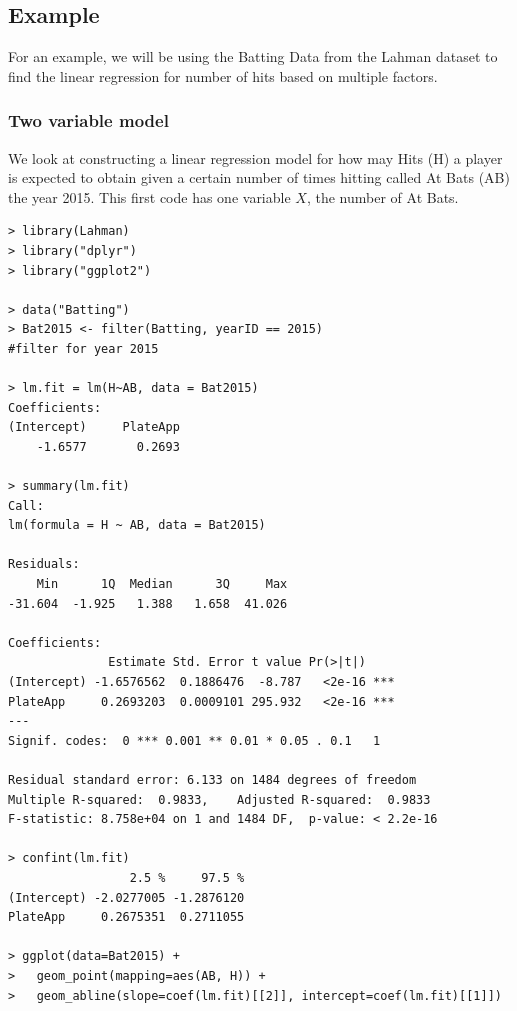 \documentclass[11pt,a4paper]{report}
\begin{document}
\subsection{Example}
For an example, we will be using the Batting Data from the Lahman dataset to find the linear regression for number of hits based on multiple factors.

\subsubsection{Two variable model}
We look at constructing a linear regression model for how may Hits (H) a player is expected to obtain given a certain number of times hitting called At Bats (AB) the year 2015. This first code has one variable $X$, the number of At Bats.
\begin{lstlisting}[basicstyle=\scriptsize]
> library(Lahman)
> library("dplyr")
> library("ggplot2")

> data("Batting")
> Bat2015 <- filter(Batting, yearID == 2015) 
#filter for year 2015
  
> lm.fit = lm(H~AB, data = Bat2015)
Coefficients:
(Intercept)     PlateApp  
    -1.6577       0.2693  

> summary(lm.fit)
Call:
lm(formula = H ~ AB, data = Bat2015)

Residuals:
    Min      1Q  Median      3Q     Max 
-31.604  -1.925   1.388   1.658  41.026 

Coefficients:
              Estimate Std. Error t value Pr(>|t|)    
(Intercept) -1.6576562  0.1886476  -8.787   <2e-16 ***
PlateApp     0.2693203  0.0009101 295.932   <2e-16 ***
---
Signif. codes:  0 *** 0.001 ** 0.01 * 0.05 . 0.1   1

Residual standard error: 6.133 on 1484 degrees of freedom
Multiple R-squared:  0.9833,	Adjusted R-squared:  0.9833 
F-statistic: 8.758e+04 on 1 and 1484 DF,  p-value: < 2.2e-16

> confint(lm.fit)
                 2.5 %     97.5 %
(Intercept) -2.0277005 -1.2876120
PlateApp     0.2675351  0.2711055

> ggplot(data=Bat2015) +
>   geom_point(mapping=aes(AB, H)) +
>   geom_abline(slope=coef(lm.fit)[[2]], intercept=coef(lm.fit)[[1]])
\end{lstlisting}
\end{document}
